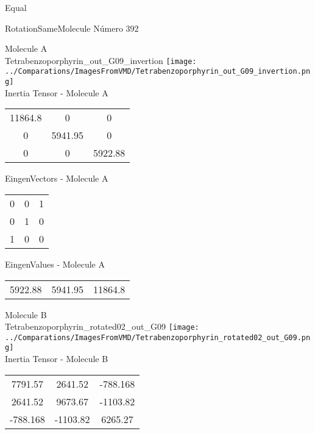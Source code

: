 \begin{center}
\vtab
\vtab
\textcolor{NavyBlue}{\Large Equal}
\end{center}

 \newpage

\vtab[-2cm]
\begin{center}
{\large RotationSameMolecule \tab Número 392}
\end{center}
\begin{multicols}{2}
\begin{center}

Molecule A \\ 
Tetrabenzoporphyrin\_out\_G09\_invertion
\texttt{[image: ../Comparations/ImagesFromVMD/Tetrabenzoporphyrin\_out\_G09\_invertion.png]}
\\
Inertia Tensor - Molecule A \\
\vtab

\begin{tabular}{|c c c|}
11864.8	 & 	0	 & 	0	 \\
0	 & 	5941.95	 & 	0	 \\
0	 & 	0	 & 	5922.88
\end{tabular}

\vtab
 EingenVectors - Molecule A     \\
\vtab
\begin{tabular}{|c c c|}
0	 & 	0	 & 	1	 \\
0	 & 	1	 & 	0	 \\
1	 & 	0	 & 	0
\end{tabular}

\vtab
 EingenValues - Molecule A     \\
\vtab
\begin{tabular}{|c c c|}
5922.88	 & 	5941.95	 & 	11864.8	 \\
\end{tabular}
\columnbreak

Molecule B \\ 
Tetrabenzoporphyrin\_rotated02\_out\_G09
\texttt{[image: ../Comparations/ImagesFromVMD/Tetrabenzoporphyrin\_rotated02\_out\_G09.png]}
\\
Inertia Tensor - Molecule B \\
\vtab

\begin{tabular}{|c c c|}
7791.57	 & 	2641.52	 & 	-788.168	 \\
2641.52	 & 	9673.67	 & 	-1103.82	 \\
-788.168	 & 	-1103.82	 & 	6265.27
\end{tabular}


\end{center}
\end{multicols}
